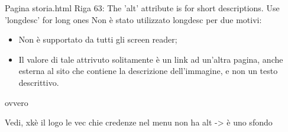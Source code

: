 
Pagina storia.html
Riga 63: The 'alt' attribute is for short descriptions. Use 'longdesc' for long ones
Non è stato utilizzato longdesc per due motivi:
\begin{itemize}
\item Non è supportato da tutti gli screen reader;
\item Il valore di tale attrivuto solitamente è un link ad un'altra pagina, anche esterna al sito che contiene la descrizione dell'immagine, e non un testo descrittivo.
\end{itemize} ovvero 

Vedi, xkè il logo le vec chie credenze nel menu non ha alt -> è uno sfondo